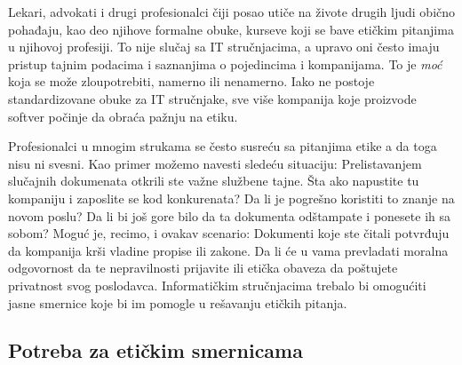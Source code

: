 \documentclass[a4paper]{article}
\begin{document}
{Lekari, advokati i drugi profesionalci čiji posao utiče na živote drugih ljudi obično pohađaju, kao deo njihove formalne obuke, kurseve koji se bave etičkim pitanjima u njihovoj profesiji. To nije slučaj sa IT stru\-čnja\-ci\-ma, a upravo oni često imaju pristup tajnim podacima i saznanjima o pojedincima i kompanijama. To je \emph{moć} koja se može zloupotrebiti, namerno ili nenamerno. Iako ne postoje standardizovane obuke za IT stručnjake, sve više kompanija koje proizvode softver počinje da obraća pažnju na etiku.

Profesionalci u mnogim strukama se često susreću sa pitanjima etike a da toga nisu ni svesni. Kao primer možemo navesti sledeću situaciju: Prelistavanjem slučajnih dokumenata otkrili ste važne službene tajne. Šta ako napustite tu kompaniju i zaposlite se kod konkurenata? Da li je pogrešno koristiti to znanje na novom poslu? Da li bi još gore bilo da ta dokumenta odštampate i ponesete ih sa sobom?
Moguć je, recimo, i ovakav scenario: Dokumenti koje ste čitali potvrđuju da kompanija krši vladine propise ili zakone. Da li će u vama prevladati moralna odgovornost da te nepravilnosti prijavite ili etička obaveza da poštujete privatnost svog poslodavca.\cite{Schneider}\cite{Reynolds}
Informatičkim stručnjacima trebalo bi omogućiti jasne smernice koje bi im pomogle u rešavanju etičkih pitanja.

\subsection{Potreba za etičkim smernicama}

}
\end{document}
